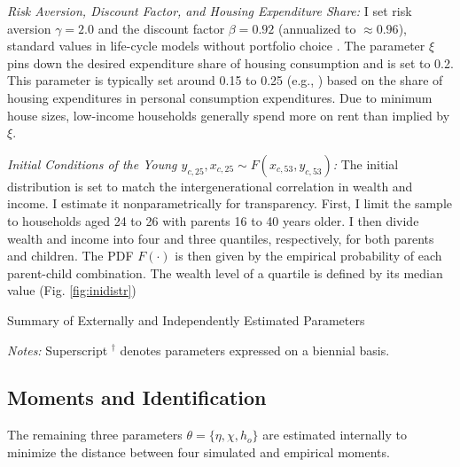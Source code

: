 \documentclass[12pt]{article}
\begin{document}

\textit{Risk Aversion, Discount Factor, and Housing Expenditure Share:} I set risk aversion $\gamma=2.0$ and the discount factor $\beta=0.92$ (annualized to $\approx0.96$), standard values in life-cycle models without portfolio choice \citep[see e.g.,][]{Kaplan2020,Boar2018}. The parameter $\xi$ pins down the desired expenditure share of housing consumption and is set to 0.2. This parameter is typically set around 0.15 to 0.25 (e.g., \citealp{Kaplan2020,Chatterjee2015,Paz-Pardo2019,davis2011household}) based on the share of housing expenditures in personal consumption expenditures. Due to minimum house sizes, low-income households generally spend more on rent than implied by $\xi$.


\textit{Initial Conditions of the Young $y_{c,25},x_{c,25}\sim F(x_{c,53},y_{c,53})$:} 
The initial distribution is set to match the intergenerational correlation in wealth and income. I estimate it nonparametrically for transparency. First, I limit the sample to households aged 24 to 26 with parents 16 to 40 years older. I then divide wealth and income into four and three quantiles, respectively, for both parents and children. The PDF $F(\cdot)$ is then given by the empirical probability of each parent-child combination. The wealth level of a quartile is defined by its median value (Fig. \ref{fig:inidistr})

 
\begin{table}
	\center
	\begin{threeparttable}
		\caption{Summary of Externally and Independently Estimated Parameters}\label{tab:calpar}
		\small
		
		\footnotesize
		\textit{Notes:} Superscript $^\dagger$ denotes parameters expressed on a biennial basis.
	\end{threeparttable}
\end{table}


\subsection{Moments and Identification}
The remaining three parameters $\theta=\{\eta,\chi,h_o\}$ are estimated internally to minimize the distance between four simulated and empirical moments. 
\end{document}
